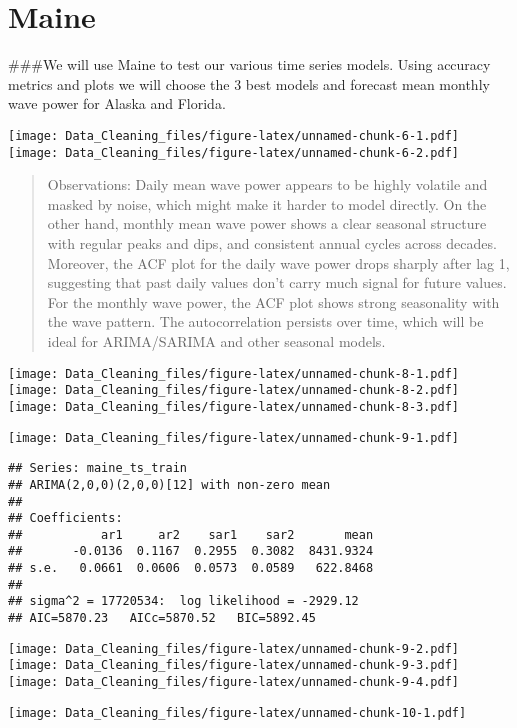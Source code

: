 \documentclass[
]{article}
\begin{document}
\section{Maine}\label{maine}

\#\#\#We will use Maine to test our various time series models. Using
accuracy metrics and plots we will choose the 3 best models and forecast
mean monthly wave power for Alaska and Florida.

\texttt{[image: Data\_Cleaning\_files/figure-latex/unnamed-chunk-6-1.pdf]}
\texttt{[image: Data\_Cleaning\_files/figure-latex/unnamed-chunk-6-2.pdf]}

\begin{quote}
Observations: Daily mean wave power appears to be highly volatile and
masked by noise, which might make it harder to model directly. On the
other hand, monthly mean wave power shows a clear seasonal structure
with regular peaks and dips, and consistent annual cycles across
decades. Moreover, the ACF plot for the daily wave power drops sharply
after lag 1, suggesting that past daily values don't carry much signal
for future values. For the monthly wave power, the ACF plot shows strong
seasonality with the wave pattern. The autocorrelation persists over
time, which will be ideal for ARIMA/SARIMA and other seasonal models.
\end{quote}

\texttt{[image: Data\_Cleaning\_files/figure-latex/unnamed-chunk-8-1.pdf]}
\texttt{[image: Data\_Cleaning\_files/figure-latex/unnamed-chunk-8-2.pdf]}
\texttt{[image: Data\_Cleaning\_files/figure-latex/unnamed-chunk-8-3.pdf]}

\texttt{[image: Data\_Cleaning\_files/figure-latex/unnamed-chunk-9-1.pdf]}

\begin{verbatim}
## Series: maine_ts_train 
## ARIMA(2,0,0)(2,0,0)[12] with non-zero mean 
## 
## Coefficients:
##           ar1     ar2    sar1    sar2       mean
##       -0.0136  0.1167  0.2955  0.3082  8431.9324
## s.e.   0.0661  0.0606  0.0573  0.0589   622.8468
## 
## sigma^2 = 17720534:  log likelihood = -2929.12
## AIC=5870.23   AICc=5870.52   BIC=5892.45
\end{verbatim}

\texttt{[image: Data\_Cleaning\_files/figure-latex/unnamed-chunk-9-2.pdf]}
\texttt{[image: Data\_Cleaning\_files/figure-latex/unnamed-chunk-9-3.pdf]}
\texttt{[image: Data\_Cleaning\_files/figure-latex/unnamed-chunk-9-4.pdf]}

\texttt{[image: Data\_Cleaning\_files/figure-latex/unnamed-chunk-10-1.pdf]}
\end{document}
